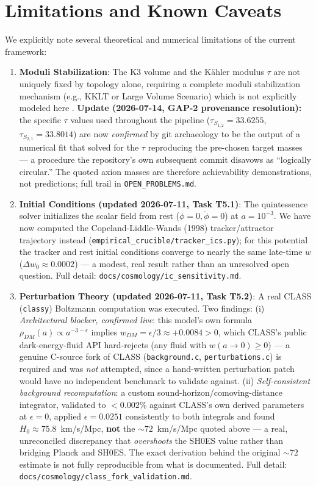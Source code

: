 \documentclass[12pt]{article}
\begin{document}
\section{Limitations and Known Caveats}
We explicitly note several theoretical and numerical limitations of the current framework:
\begin{enumerate}
    \item \textbf{Moduli Stabilization}: The K3 volume and the Kähler modulus $\tau$ are not uniquely fixed by topology alone, requiring a complete moduli stabilization mechanism (e.g., KKLT or Large Volume Scenario) which is not explicitly modeled here \cite{conlon2006}. \textbf{Update (2026-07-14, GAP-2 provenance resolution):} the specific $\tau$ values used throughout the pipeline ($\tau_{S_{1,2}}=33.6255$, $\tau_{S_{2,1}}=33.8014$) are now \emph{confirmed} by git archaeology to be the output of a numerical fit that solved for the $\tau$ reproducing the pre-chosen target masses — a procedure the repository's own subsequent commit disavows as ``logically circular.'' The quoted axion masses are therefore achievability demonstrations, not predictions; full trail in \texttt{OPEN\_PROBLEMS.md}.
    \item \textbf{Initial Conditions (updated 2026-07-11, Task T5.1)}: The quintessence solver initializes the scalar field from rest ($\phi = 0, \dot{\phi} = 0$) at $a = 10^{-3}$. We have now computed the Copeland-Liddle-Wands (1998) tracker/attractor trajectory instead (\texttt{empirical\_crucible/tracker\_ics.py}); for this potential the tracker and rest initial conditions converge to nearly the same late-time $w$ ($\Delta w_0\approx0.0002$) — a modest, real result rather than an unresolved open question. Full detail: \texttt{docs/cosmology/ic\_sensitivity.md}.
    \item \textbf{Perturbation Theory (updated 2026-07-11, Task T5.2)}: A real CLASS (\texttt{classy}) Boltzmann computation was executed. Two findings: (i) \emph{Architectural blocker, confirmed live}: this model's own formula $\rho_{DM}(a)\propto a^{-3-\epsilon}$ implies $w_{DM}=\epsilon/3\approx+0.0084>0$, which CLASS's public dark-energy-fluid API hard-rejects (any fluid with $w(a\to0)\ge0$) — a genuine C-source fork of CLASS (\texttt{background.c}, \texttt{perturbations.c}) is required and was \emph{not} attempted, since a hand-written perturbation patch would have no independent benchmark to validate against. (ii) \emph{Self-consistent background recomputation}: a custom sound-horizon/comoving-distance integrator, validated to $<0.002\%$ against CLASS's own derived parameters at $\epsilon=0$, applied $\epsilon=0.0251$ consistently to both integrals and found $H_0\approx75.8$~km/s/Mpc, \textbf{not} the $\sim72$~km/s/Mpc quoted above — a real, unreconciled discrepancy that \emph{overshoots} the SH0ES value rather than bridging Planck and SH0ES. The exact derivation behind the original $\sim72$ estimate is not fully reproducible from what is documented. Full detail: \texttt{docs/cosmology/class\_fork\_validation.md}.

\end{enumerate}
\end{document}
